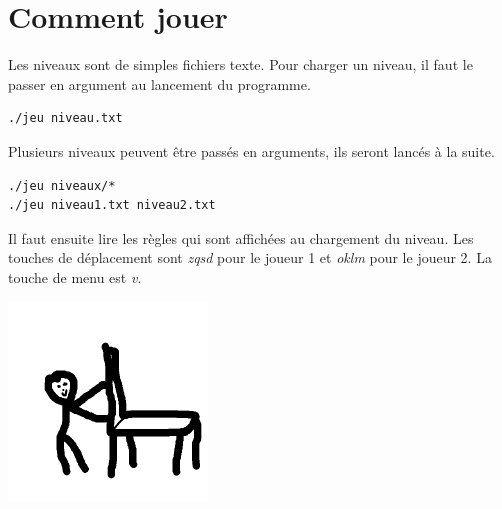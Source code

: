 \documentclass{article}
\begin{document}
\section{Comment jouer}

Les niveaux sont de simples fichiers texte. 
Pour charger un niveau, il faut le passer en argument au lancement du programme.
\begin{lstlisting}
./jeu niveau.txt
\end{lstlisting}
Plusieurs niveaux peuvent être passés en arguments, ils seront lancés à la suite.
\begin{lstlisting}
./jeu niveaux/*
./jeu niveau1.txt niveau2.txt
\end{lstlisting}
Il faut ensuite lire les règles qui sont affichées au chargement du niveau.
Les touches de déplacement sont \emph{zqsd} pour le joueur 1 et \emph{oklm} pour le joueur 2.
La touche de menu est \emph{v}.

\begin{center}
    \includegraphics[width=200px,height=200px]{logo.png}
\end{center}
\end{document}
